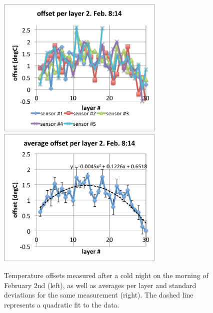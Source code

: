 \documentclass[a4paper,10pt]{article}
\begin{document}
\begin{figure}[t]
\label{fig-offsets-largespreads}
\centering
\includegraphics[width=8cm]{offset-per-layer-2-feb-8_14.pdf}
\includegraphics[width=8cm]{average-offset-per-layer-2-feb-8_14.pdf}
\caption{Temperature offsets measured after a cold night on the morning of February 2nd (left), 
as well as averages per layer
and standard deviations for the same measurement (right). 
The dashed line represents a quadratic fit to the data.}
\end{figure}
\end{document}
